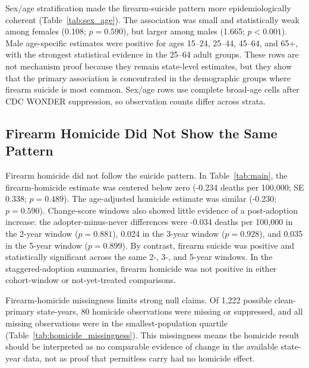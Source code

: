 \documentclass[11pt]{article}
\begin{document}




Sex/age stratification made the firearm-suicide pattern more epidemiologically coherent (Table~\ref{tab:sex_age}). The association was small and statistically weak among females (0.108; $p=0.590$), but larger among males (1.665; $p<0.001$). Male age-specific estimates were positive for ages 15--24, 25--44, 45--64, and 65+, with the strongest statistical evidence in the 25--64 adult groups. These rows are not mechanism proof because they remain state-level estimates, but they show that the primary association is concentrated in the demographic groups where firearm suicide is most common. Sex/age rows use complete broad-age cells after CDC WONDER suppression, so observation counts differ across strata.





\subsection*{Firearm Homicide Did Not Show the Same Pattern}

Firearm homicide did not follow the suicide pattern. In Table~\ref{tab:main}, the firearm-homicide estimate was centered below zero (-0.234 deaths per 100,000; SE 0.338; $p=0.489$). The age-adjusted homicide estimate was similar (-0.230; $p=0.590$). Change-score windows also showed little evidence of a post-adoption increase: the adopter-minus-never differences were -0.034 deaths per 100,000 in the 2-year window ($p=0.881$), 0.024 in the 3-year window ($p=0.928$), and 0.035 in the 5-year window ($p=0.899$). By contrast, firearm suicide was positive and statistically significant across the same 2-, 3-, and 5-year windows. In the staggered-adoption summaries, firearm homicide was not positive in either cohort-window or not-yet-treated comparisons.

Firearm-homicide missingness limits strong null claims. Of 1,222 possible clean-primary state-years, 80 homicide observations were missing or suppressed, and all missing observations were in the smallest-population quartile (Table~\ref{tab:homicide_missingness}). This missingness means the homicide result should be interpreted as no comparable evidence of change in the available state-year data, not as proof that permitless carry had no homicide effect.
\end{document}

